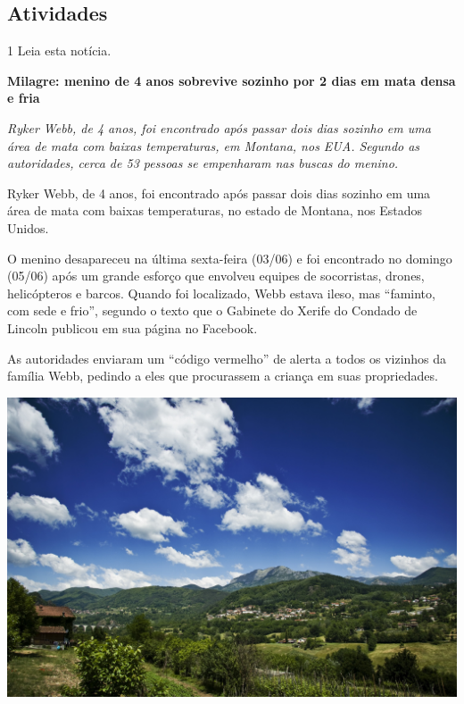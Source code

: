 \begin{conteudo}
\begin{conteudo}
\begin{conteudo}
\begin{conteudo}
\section*{Atividades}

\num{1} Leia esta notícia.



\begin{myquote}
\textbf{Milagre: menino de 4 anos sobrevive sozinho por 2 dias em mata densa e fria}

\emph{Ryker Webb, de 4 anos, foi encontrado após passar dois dias
sozinho em uma área de mata com baixas temperaturas, em Montana, nos
EUA. Segundo as autoridades, cerca de 53 pessoas se empenharam nas
buscas do menino.}

Ryker Webb, de 4 anos, foi encontrado após passar dois dias sozinho em
uma área de mata com baixas temperaturas, no estado de Montana, nos
Estados Unidos.

O menino desapareceu na última sexta-feira (03/06) e foi encontrado no
domingo (05/06) após um grande esforço que envolveu equipes de
socorristas, drones, helicópteros e barcos. Quando foi localizado, Webb
estava ileso, mas ``faminto, com sede e frio'', segundo o texto que o
Gabinete do Xerife do Condado de Lincoln publicou em sua página no
Facebook.

As autoridades enviaram um ``código vermelho'' de alerta a todos os
vizinhos da família Webb, pedindo a eles que procurassem a criança em
suas propriedades.

\begin{center}
\noindent\includegraphics[width=\textwidth]{media/image20b.jpg}
\end{center}


\end{myquote}
\end{conteudo}
\end{conteudo}
\end{conteudo}
\end{conteudo}

